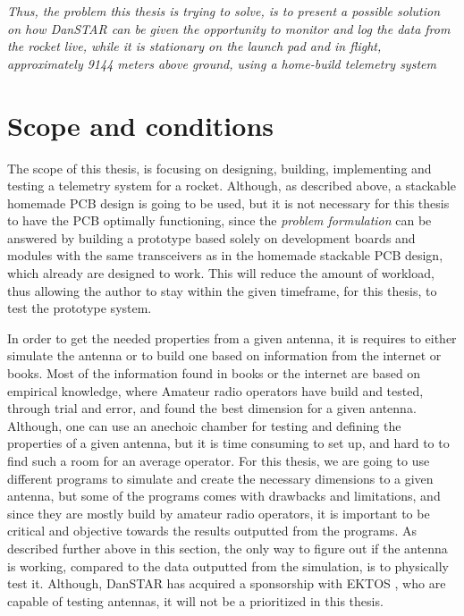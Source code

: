 \textit{Thus, the problem this thesis is trying to solve, is to present a possible solution on how DanSTAR can be given the opportunity to monitor and log the data from the rocket live, while it is stationary on the launch pad and in flight, approximately 9144 meters above ground, using a home-build telemetry system}

\section{Scope and conditions}
The scope of this thesis, is focusing on designing, building, implementing and testing a telemetry system for a rocket. Although, as described above, a stackable homemade PCB design is going to be used, but it is not necessary for this thesis to have the PCB optimally functioning, since the \textit{problem formulation} can be answered by building a prototype based solely on development boards and modules with the same transceivers as in the homemade stackable PCB design, which already are designed to work. This will reduce the amount of workload, thus allowing the author to stay within the given timeframe, for this thesis, to test the prototype system.

In order to get the needed properties from a given antenna, it is requires to either simulate the antenna or to build one based on information from the internet or books. Most of the information found in books or the internet are based on empirical knowledge, where Amateur radio operators\cite{Ham} have build and tested, through trial and error, and found the best dimension for a given antenna. Although, one can use an anechoic chamber\cite{anechoic} for testing and defining the properties of a given antenna, but it is time consuming to set up, and hard to to find such a room for an average operator. For this thesis, we are going to use different programs to simulate and create the necessary dimensions to a given antenna, but some of the programs comes with drawbacks and limitations, and since they are mostly build by amateur radio operators, it is important to be critical and objective towards the results outputted from the programs. As described further above in this section, the only way to figure out if the antenna is working, compared to the data outputted from the simulation, is to physically test it. Although, DanSTAR has acquired a sponsorship with EKTOS \cite{EKTOS}, who are capable of testing antennas, it will not be a prioritized in this thesis. 

